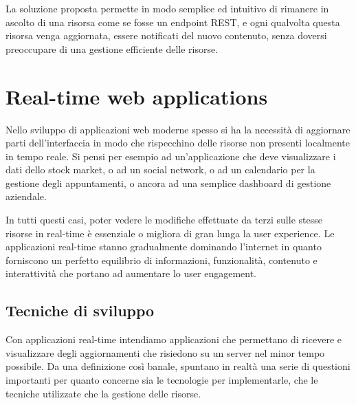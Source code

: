 \documentclass[12pt,a4paper,openright,twoside]{report}
\begin{document}
\bigskip

La soluzione proposta permette in modo semplice ed intuitivo di rimanere in ascolto di una risorsa come se fosse un endpoint REST, e ogni qualvolta questa risorsa venga aggiornata, essere notificati del nuovo contenuto, senza doversi preoccupare di una gestione efficiente delle risorse.

\chapter{Real-time web applications}
\pagestyle{fancy}
\lhead[\rmfamily\thepage]{\fancyplain{}{\itshape\nouppercase\rightmark}} %
\rhead[\fancyplain{}{\itshape\nouppercase\leftmark}]{\rmfamily\thepage} %

Nello sviluppo di applicazioni web moderne spesso si ha la necessità di aggiornare parti dell’interfaccia in modo che rispecchino delle risorse non presenti localmente in tempo reale. Si pensi per esempio ad un’applicazione che deve visualizzare i dati dello stock market, o ad un social network, o ad un calendario per la gestione degli appuntamenti, o ancora ad una semplice dashboard di gestione aziendale. 

\bigskip

In tutti questi casi, poter vedere le modifiche effettuate da terzi sulle stesse risorse in real-time è essenziale o migliora di gran lunga la user experience. Le applicazioni real-time stanno gradualmente dominando l’internet in quanto forniscono un perfetto equilibrio di informazioni, funzionalità, contenuto e interattività che portano ad aumentare lo user engagement.

\section{Tecniche di sviluppo}

Con applicazioni real-time intendiamo applicazioni che permettano di ricevere e visualizzare degli aggiornamenti che risiedono su un server nel minor tempo possibile. Da una definizione così banale, spuntano in realtà una serie di questioni importanti per quanto concerne sia le tecnologie per implementarle, che le tecniche utilizzate che la gestione delle risorse.
\end{document}
